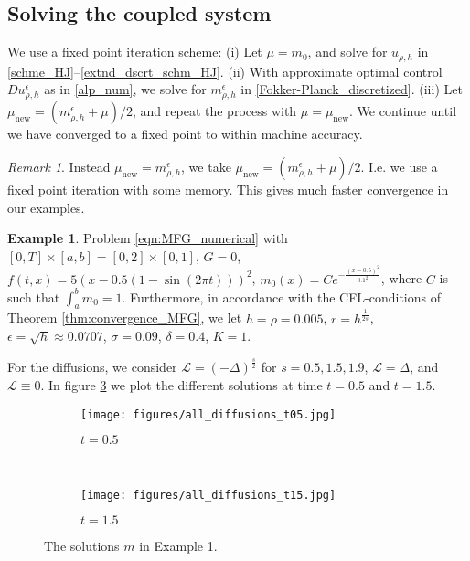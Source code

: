 \documentclass[a4paper,  twoside, 10pt, leqno]{amsart}
\theoremstyle{remark}
\newtheorem{remark}[thm]{Remark}
\theoremstyle{definition}
\newtheorem{example}{Example}
\begin{document}
\subsection*{Solving the coupled system}
We use a fixed point iteration scheme: (i) Let $\mu = m_0$, and solve for $u_{\rho,h}$ in \eqref{schme_HJ}--\eqref{extnd_dscrt_schm_HJ}. (ii)
With approximate optimal control $Du_{\rho,h}^{\epsilon}$ as in \eqref{alp_num}, we solve for 
$m_{\rho,h}^{\epsilon}$ in \eqref{Fokker-Planck_discretized}. (iii) Let
$\mu_{\text{new}} = ( m_{\rho,h}^{\epsilon} + \mu)/2$, and repeat the process with $\mu=\mu_{\text{new}}$. We continue until we have converged to a fixed point to within machine accuracy.

\begin{remark}
Instead $\mu_{\text{new}} = m_{\rho,h}^{\epsilon}$, we take $\mu_{\text{new}} =( m_{\rho,h}^{\epsilon} + \mu)/2$.  I.e. we use a fixed point iteration with some memory. This gives much faster convergence in our examples. 
\end{remark}

\begin{example}\label{ex1}
Problem \eqref{eqn:MFG_numerical} with $ [ 0,T ] \times [ a,b ] = [ 0,2 ] \times [ 0,1  ]$, $G = 0$, $f ( t,x ) = 5 (  x - 0.5(1 - \sin(2 \pi t)))^2$,  
$m_{0} ( x ) = C e^{-\frac{(x-0.5)^2}{0.1^2}} $, where $C$ 
is such that $\int_{a}^b m_{0} = 1$. 
Furthermore, 
in accordance with the CFL-conditions of 
Theorem \ref{thm:convergence_MFG},
we let $h = \rho = 0.005$, $r = h^{\frac{1}{2 s}}$,
$\epsilon = \sqrt{h} \approx 0.0707$, $\sigma=0.09$, $\delta = 0.4$, $K=1$. 

For the diffusions, we consider $\mathcal{L} = ( - \Delta )^{\frac{s}{2}}$ 
for $s =0.5, 1.5, 1.9$, 
$\mathcal{L} = \Delta$, and $\mathcal{L} \equiv 0$.
In figure \ref{fig:all_times} we plot
the different solutions at time $t=0.5$ and  $t=1.5$. 
\end{example}
\begin{figure}[ht!]
    \centering
    \begin{subfigure}[b]{0.49\textwidth}
        \texttt{[image: figures/all\_diffusions\_t05.jpg]}
        \caption{$t=0.5$}
        \label{fig:ex1m05}
    \end{subfigure}
    ~ %
    \begin{subfigure}[b]{0.49\textwidth}
        \texttt{[image: figures/all\_diffusions\_t15.jpg]}
        \caption{$t=1.5$}
        \label{fig:ex1u05}
    \end{subfigure}
    \caption{The solutions $m$ in Example 1.}
    \label{fig:all_times}
\end{figure}
\end{document}
